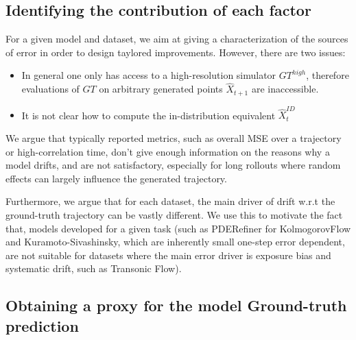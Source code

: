 \documentclass{article}
\begin{document}
\subsection{Identifying the contribution of each factor}

For a given model and dataset, we aim at giving a characterization of the sources of error in order to design taylored improvements. However, there are two issues:
\begin{itemize}
    \item In general one only has access to a high-resolution simulator $GT^{high}$, therefore evaluations of $GT$ on arbitrary generated points $\hat{X}_{t+1}$ are inaccessible.
    \item It is not clear how to compute the in-distribution equivalent $\hat{X}_t^{ID}$
\end{itemize}

We argue that typically reported metrics, such as overall MSE over a trajectory or high-correlation time, don't give enough information on the reasons why a model drifts, and are not satisfactory, especially for long rollouts where random effects can largely influence the generated trajectory.

Furthermore, we argue that for each dataset, the main driver of drift w.r.t the ground-truth trajectory can be vastly different. We use this to motivate the fact that, models developed for a given task (such as PDERefiner for KolmogorovFlow and Kuramoto-Sivashinsky, which are inherently small one-step error dependent, are not suitable for datasets where the main error driver is exposure bias and systematic drift, such as Transonic Flow). 

\subsection{Obtaining a proxy for the model Ground-truth prediction}
\end{document}
